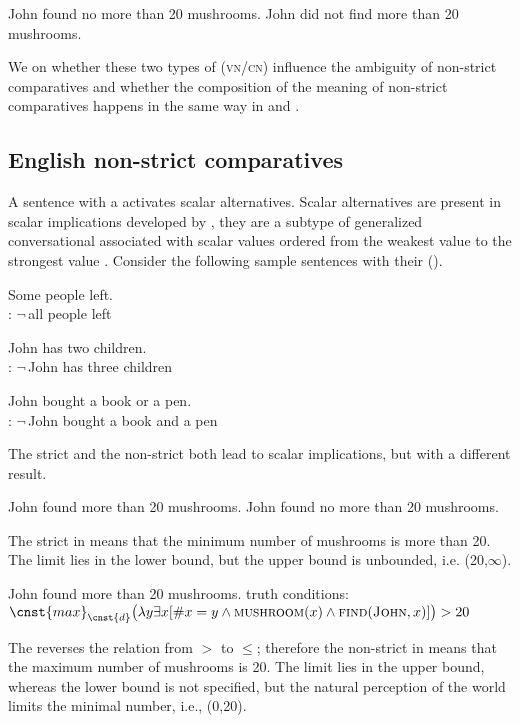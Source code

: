 \documentclass[output=paper, colorlinks, citecolor=brown, newtxmath]{langsci/langscibook}
\begin{document}
\ea \ea John found no more than 20 mushrooms.\label{ex:mush_cn}
\ex John did not find more than 20 mushrooms.\label{ex:mush_vn}
\z
\z


\noindent We  on whether these two types of  (\textsc{vn/cn}) influence the ambiguity of non-strict comparatives and whether the composition of the meaning of non-strict comparatives happens in the same way in  and .



\subsection{English non-strict comparatives}

A sentence with a  activates scalar alternatives. Scalar alternatives are present in scalar implications developed by \cite{horn1989natural,horn1996presupposition}, they are a subtype of generalized conversational  associated with scalar values ordered from the weakest value to the strongest value \citep{horn20135}. Consider the following sample sentences with their  ().

\ea Some people left.\\
: $\neg\,$all people left
\z

\ea John has two children.\\
: $\neg\,$John has three children
\z

\ea John bought a book or a pen.\\
: $\neg\,$John bought a book and a pen
\z


\noindent The strict   and the non-strict   both lead to scalar implications, but with a different result.

\ea \ea John found more than 20 mushrooms.\label{ex:str}
\ex John found no more than 20 mushrooms.\label{ex:non_str}
\z
\z

\noindent The strict  in  means that the  minimum number of mushrooms is more than 20. The limit lies in the lower bound, but the upper bound is unbounded, i.e. (20,$\infty$).

\ea John found more than 20 mushrooms.
\ea truth conditions: $\cnst{max}_{\cnst{d}}\big(\lambda y\exists x[\#x=y \wedge \textsc{mushroom}(x) \wedge \textsc{find}(\textsc{John},x)]\big) > 20$
\z
\z


\noindent The  reverses the relation from $>$ to $\leq$; therefore the non-strict  in  means that the maximum number of mushrooms is 20. The limit lies in the upper bound, whereas the lower bound is not specified, but the natural perception of the world limits the minimal number, i.e., (0,20).
\end{document}
